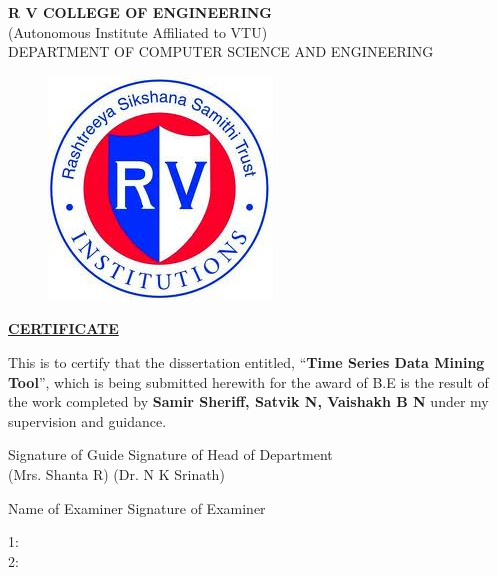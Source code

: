 \documentclass[12pt]{report}
\begin{document}
\begin{titlepage}
\newpage
\begin{center}
{\bfseries\large R V COLLEGE OF ENGINEERING}\\
{\normalsize (Autonomous Institute Affiliated to VTU)}\\
{\normalsize DEPARTMENT OF COMPUTER SCIENCE AND ENGINEERING}\\
\end{center}
	
\begin{figure}[h!]
	\centering
		\includegraphics[scale=0.5]{RVCE.png}
\end{figure}

\begin{center}
\bf{\underline{CERTIFICATE}}
\end{center}
\noindent This is to certify that the dissertation entitled, ``\textbf{Time Series Data Mining Tool}'',  which is being submitted herewith for the award of B.E is the result of the work completed by \textbf{Samir Sheriff, Satvik N, Vaishakh B N}  under my supervision and guidance.
\vspace{.5in}

\begin{flushleft} 
\vspace{.5in}
Signature of Guide 	
\hspace{4cm}
 Signature of Head of Department  \\
(Mrs. Shanta R)  \hspace{6cm}(Dr. N K Srinath) \\
 
 \end{flushleft} 
\begin{flushleft}
\hspace{1in}Name of Examiner \hspace{1.25in} Signature of Examiner
\end{flushleft}
\begin{flushleft}
1: \\
\vspace{.5in} 
2: 
\end{flushleft}
\end{titlepage}
\end{document}
